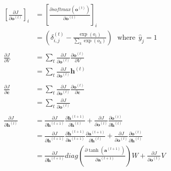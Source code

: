 \documentclass[a4]{article}
\begin{document}
\begin{equation}
\begin{aligned}
\left[\frac{\partial J}{\partial \bm{o}^{(t)}}\right]_i 
&=
\left[\frac{\partial softmax(\bm{o}^{(t)})}{\partial \bm{o}^{(t)}}\right]_i\\
 &= \left(
\delta_{i,j}^{(t)} - \frac{\exp(o_i)}{\sum_k \exp(o_k)}
\right) \:\:\: \text{where}\:\:\hat{y}_j = 1\\
\\
\frac{\partial J}{\partial V} &= \sum_{t} \frac{\partial J}{\partial \bm{o}^{(t)}}
\frac{\partial \bm{o}^{(t)}}{\partial V}\\
&= \sum_{t} \frac{\partial J}{\partial \bm{o}^{(t)}}
\bm{h}^{(t)}\\
\\
\frac{\partial J}{\partial \bm{c}} &= \sum_{t} \frac{\partial J}{\partial \bm{o}^{(t)}}
\frac{\partial \bm{o}^{(t)}}{\partial \bm{c}}\\
&= \sum_{t} \frac{\partial J}{\partial \bm{o}^{(t)}}\\
\\
\frac{\partial J}{\partial \bm{h}^{(t)}} &=
\frac{\partial J}{\partial \bm{h}^{(t+1)}}
\frac{\partial \bm{h}^{(t+1)}}{\partial \bm{h}^{(t)}} +
\frac{\partial J}{\partial \bm{o}^{(t)}}
\frac{\partial \bm{o}^{(t)}}{\partial \bm{h}^{(t)}}\\
&=
\frac{\partial J}{\partial \bm{h}^{(t+1)}}
\frac{\partial \bm{h}^{(t+1)}}{\partial \bm{a}^{(t+1)}}
\frac{\partial \bm{a}^{(t+1)}}{\partial \bm{h}^{(t)}} +
\frac{\partial J}{\partial \bm{o}^{(t)}}
\frac{\partial \bm{o}^{(t)}}{\partial \bm{h}^{(t)}}\\
&=
\frac{\partial J}{\partial \bm{h}^{(t+1)}}
diag\left(\frac{\partial \tanh(\bm{a}^{(t+1)})}{\partial \bm{a}^{(t+1)}}\right)W +
\frac{\partial J}{\partial \bm{o}^{(t)}}V\\
\end{aligned}
\end{equation}
\end{document}

